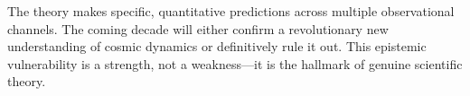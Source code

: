 The theory makes specific, quantitative predictions across multiple observational channels. The coming decade will either confirm a revolutionary new understanding of cosmic dynamics or definitively rule it out. This epistemic vulnerability is a strength, not a weakness---it is the hallmark of genuine scientific theory.
